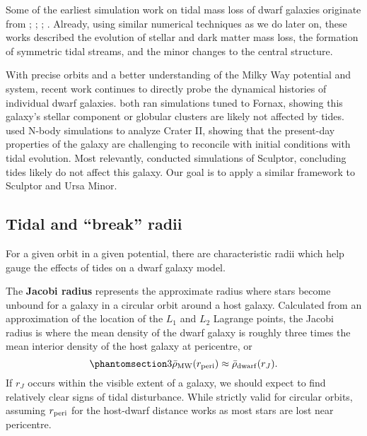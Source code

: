 Some of the earliest simulation work on tidal mass loss of dwarf
galaxies originate from \citet{oh+lin+aarseth1995};
\citet{piatek+pryor1995}; \citet{moore+davis1994};
\citet{johnston+spergel+hernquist1995}. Already, using similar numerical
techniques as we do later on, these works described the evolution of
stellar and dark matter mass loss, the formation of symmetric tidal
streams, and the minor changes to the central structure.

With precise orbits and a better understanding of the Milky Way
potential and system, recent work continues to directly probe the
dynamical histories of individual dwarf galaxies.
\citet{borukhovetskaya+2022, dicintio+2024} both ran simulations tuned
to Fornax, showing this galaxy's stellar component or globular clusters
are likely not affected by tides. \citet{borukhovetskaya+2022a} used
N-body simulations to analyze Crater II, showing that the present-day
properties of the galaxy are challenging to reconcile with \LCDM{}
initial conditions with tidal evolution. Most relevantly,
\citet{iorio+2019} conducted simulations of Sculptor, concluding tides
likely do not affect this galaxy. Our goal is to apply a similar
framework to Sculptor and Ursa Minor.

\subsection{Tidal and ``break'' radii}\label{sec:break_radii}

For a given orbit in a given potential, there are characteristic radii
which help gauge the effects of tides on a dwarf galaxy model.

The \textbf{Jacobi radius} represents the approximate radius where stars
become unbound for a galaxy in a circular orbit around a host galaxy.
Calculated from an approximation of the location of the \(L_1\) and
\(L_2\) Lagrange points, the Jacobi radius is where the mean density of
the dwarf galaxy is roughly three times the mean interior density of the
host galaxy at pericentre, or
\begin{equation}\protect\phantomsection\label{eq:r_jacobi}{
3\bar \rho_{\rm MW}(r_{\rm peri}) \approx \bar \rho_{\rm dwarf}(r_J).
}\end{equation} If \(r_J\) occurs within the visible extent of a galaxy,
we should expect to find relatively clear signs of tidal disturbance.
While strictly valid for circular orbits, assuming \(r_{\rm peri}\) for
the host-dwarf distance works as most stars are lost near pericentre.

